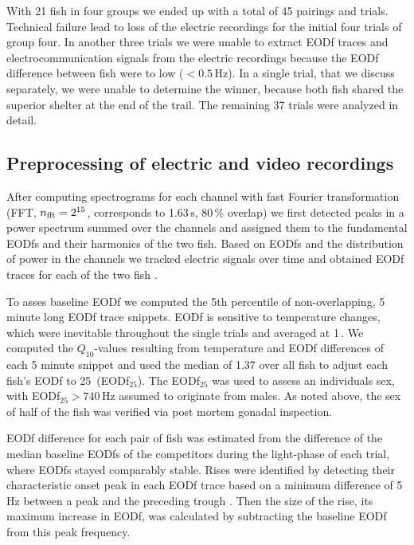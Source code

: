 \documentclass[vruler,JEB]{COB}%
\begin{document}
With 21 fish in four groups we ended up with a total of 45 pairings and trials. Technical failure lead to loss of the electric recordings for the initial four trials of group four. In another three trials we were unable to extract EODf traces and electrocommunication signals from the electric recordings because the EODf difference between fish were to low ($<0.5$\,Hz). In a single trial, that we discuss separately, we were unable to determine the winner, because both fish shared the superior shelter at the end of the trail. The remaining 37 trials were analyzed in detail.

\subsection{Preprocessing of electric and video recordings}

After computing spectrograms for each channel with fast Fourier transformation (FFT, $n_{\rm fft}=2^{15}$, corresponds to 1.63\,s, 80\,\% overlap) we first detected peaks in a power spectrum summed over the channels and assigned them to the fundamental EODfs and their harmonics of the two fish. Based on EODfs and the distribution of power in the channels we tracked electric signals over time and obtained EODf traces for each of the two fish \citep{Henninger2018,Henninger2020, Madhav2018}.

To asses baseline EODf we computed the 5th percentile of non-overlapping, 5 minute long EODf trace snippets. EODf is sensitive to temperature changes, which were inevitable throughout the single trials and averaged at 1\,\celsius. We computed the $Q_{10}$-values resulting from temperature and EODf differences of each 5 minute snippet and used the median of 1.37 over all fish to adjust each fish's EODf to 25\,\celsius{} (EODf$_{25}$). The EODf$_{25}$ was used to assess an individuals sex, with EODf$_{25} > 740$\,Hz assumed to originate from males. As noted above, the sex of half of the fish was verified via post mortem gonadal inspection.

EODf difference for each pair of fish was estimated from the difference of the median baseline EODfs of the competitors during the light-phase of each trial, where EODfs stayed comparably stable. Rises were identified by detecting their characteristic onset peak in each EODf trace based on a minimum difference of 5\,Hz between a peak and the preceding trough \citep{Todd1999}. Then the size of the rise, its maximum increase in EODf, was calculated by subtracting the baseline EODf from this peak frequency. 
\end{document}
